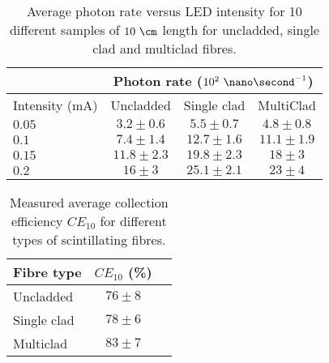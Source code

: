 \begin{table}[htbp]
\centering{}%
\begin{tabular}{lccc}
\toprule 
 & \multicolumn{3}{c}{Photon rate ($10^{2}~\nano\second^{-1}$)} \tabularnewline
\midrule
Intensity (mA) & Uncladded & Single clad & MultiClad \tabularnewline
\midrule
\midrule
$0.05$ & $3.2 \pm 0.6$ & $5.5 \pm 0.7$ & $4.8 \pm 0.8$ \tabularnewline
$0.1$ & $7.4 \pm 1.4$ & $12.7 \pm 1.6$ & $11.1 \pm 1.9$ \tabularnewline
$0.15$ & $11.8 \pm 2.3$ & $19.8 \pm 2.3$ & $18\pm 3$ \tabularnewline
$0.2$ & $16 \pm 3$ & $25.1 \pm 2.1$ & $23 \pm 4$ \tabularnewline
\bottomrule
\end{tabular}
\caption{Average photon rate versus LED intensity for 10 different samples of $10~\cm$ length for uncladded, single clad and multiclad fibres.}
\label{tab:10DifferentSamplesAlltypes}
\end{table}


\begin{table}[htbp]
\centering{}%
\begin{tabular}{lcc}
\toprule 
Fibre type & $CE_{10}$ (\%) \tabularnewline
\midrule
\midrule 
Uncladded & $76 \pm 8$ \tabularnewline
Single clad & $78 \pm 6$ \tabularnewline
Multiclad & $83 \pm 7$ \tabularnewline
\bottomrule
\end{tabular}
\caption{Measured average collection efficiency $CE_{10}$ for different types of scintillating fibres.}
\label{tab:CollectionEfficiencyOfFibers}
\end{table}



